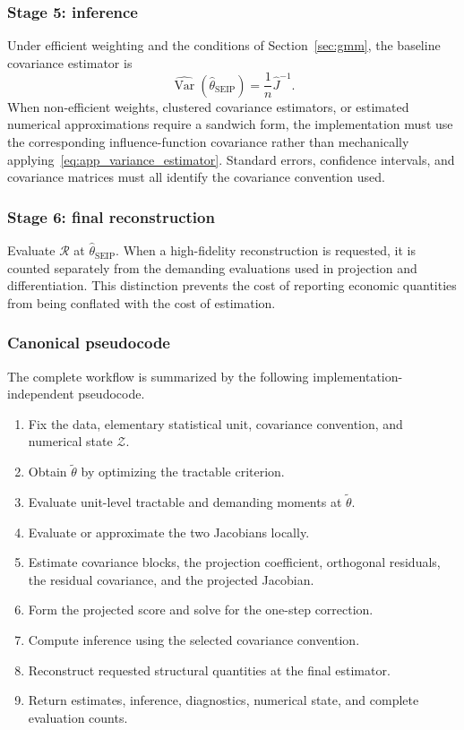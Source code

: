 \subsubsection{Stage 5: inference}

Under efficient weighting and the conditions of Section~\ref{sec:gmm}, the
baseline covariance estimator is
\begin{equation}
 \widehat{\operatorname{Var}}
 (\widehat\theta_{\mathrm{SEIP}})
 =
 \frac{1}{n}\widehat J^{-1}.
 \label{eq:app_variance_estimator}
\end{equation}
When non-efficient weights, clustered covariance estimators, or estimated
numerical approximations require a sandwich form, the implementation must use
the corresponding influence-function covariance rather than
mechanically applying~\eqref{eq:app_variance_estimator}. Standard errors,
confidence intervals, and covariance matrices must all identify the covariance
convention used.

\subsubsection{Stage 6: final reconstruction}

Evaluate $\mathcal R$ at $\widehat\theta_{\mathrm{SEIP}}$. When a high-fidelity
reconstruction is requested, it is counted separately from the demanding
evaluations used in projection and differentiation. This distinction prevents
the cost of reporting economic quantities from being conflated with the cost of
estimation.

\subsubsection{Canonical pseudocode}

The complete workflow is summarized by the following implementation-independent
pseudocode.

\begin{enumerate}
 \item Fix the data, elementary statistical unit, covariance convention, and
 numerical state $\mathcal Z$.
 \item Obtain $\widetilde\theta$ by optimizing the tractable criterion.
 \item Evaluate unit-level tractable and demanding moments at
 $\widetilde\theta$.
 \item Evaluate or approximate the two Jacobians locally.
 \item Estimate covariance blocks, the projection coefficient, orthogonal
 residuals, the residual covariance, and the projected Jacobian.
 \item Form the projected score and solve for the one-step correction.
 \item Compute inference using the selected covariance convention.
 \item Reconstruct requested structural quantities at the final estimator.
 \item Return estimates, inference, diagnostics, numerical state, and complete
 evaluation counts.
\end{enumerate}

